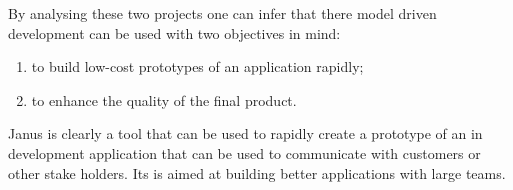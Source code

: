By analysing these two projects one can infer that there model driven development can be used with two objectives in mind:
\begin{enumerate}
\item to build low-cost prototypes of an application rapidly;
\item to enhance the quality of the final product.
\end{enumerate}

Janus is clearly a tool that can be used to rapidly create a prototype of an in development application that can be used to communicate with customers or other stake holders. Its is aimed at building better applications with large teams.

